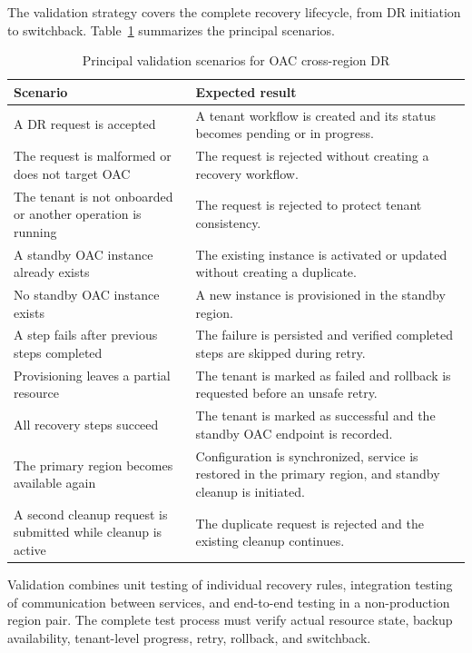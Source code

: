 The validation strategy covers the complete recovery lifecycle, from DR initiation to switchback. Table~\ref{tab:dr-validation} summarizes the principal scenarios.

\begin{table}[H]
\centering
\caption{Principal validation scenarios for OAC cross-region DR}
\label{tab:dr-validation}
\begin{tabularx}{\textwidth}{@{}X X@{}}
\toprule
\textbf{Scenario} & \textbf{Expected result} \\
\midrule
A DR request is accepted & A tenant workflow is created and its status becomes pending or in progress. \\
The request is malformed or does not target OAC & The request is rejected without creating a recovery workflow. \\
The tenant is not onboarded or another operation is running & The request is rejected to protect tenant consistency. \\
A standby OAC instance already exists & The existing instance is activated or updated without creating a duplicate. \\
No standby OAC instance exists & A new instance is provisioned in the standby region. \\
A step fails after previous steps completed & The failure is persisted and verified completed steps are skipped during retry. \\
Provisioning leaves a partial resource & The tenant is marked as failed and rollback is requested before an unsafe retry. \\
All recovery steps succeed & The tenant is marked as successful and the standby OAC endpoint is recorded. \\
The primary region becomes available again & Configuration is synchronized, service is restored in the primary region, and standby cleanup is initiated. \\
A second cleanup request is submitted while cleanup is active & The duplicate request is rejected and the existing cleanup continues. \\
\bottomrule
\end{tabularx}
\end{table}

Validation combines unit testing of individual recovery rules, integration testing of communication between services, and end-to-end testing in a non-production region pair. The complete test process must verify actual resource state, backup availability, tenant-level progress, retry, rollback, and switchback.

